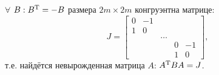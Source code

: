 \begin{to_thr}
    $\forall$ $B: B^{\text{T}} = - B$ размера $2m \times 2m$ конгруэнтна матрице:
    \begin{equation}
        J = \begin{bmatrix}
            0   & -1    &       &   &   \\
            1   & 0     &       &   &   \\
                &       &\dots  &   &   \\
                &       &       &0  &-1 \\
                &       &       &1  &0  
        \end{bmatrix},
    \end{equation}
т.е. найдётся невырожденная матрица $A$: $A^{\text{T}} B A = J$.
\end{to_thr}


